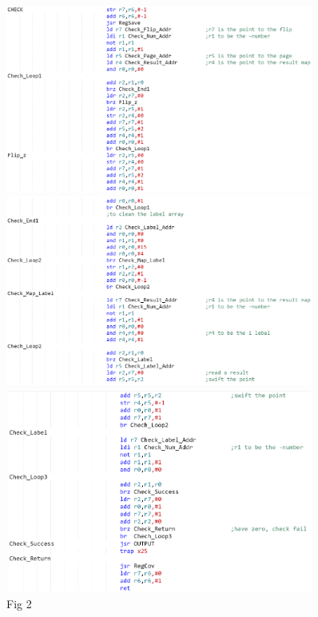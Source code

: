 \documentclass[twoside]{article}
\begin{document}
\begin{CJK*}{UTF8}{gbsn}
	\begin{figure}[htbp]
		\centering
		\caption{Fig 2} %
		\begin{minipage}[t]{0.4\textwidth}
			\small
			\centering
			\includegraphics[width=0.9\textwidth]{3.eps}
		\end{minipage}
		\begin{minipage}[t]{0.4\textwidth}
			\small
			\centering
			\includegraphics[width=0.9\textwidth]{4.eps}
		\end{minipage}
		\begin{minipage}[t]{0.4\textwidth}
			\small
			\centering
			\includegraphics[width=0.9\textwidth]{1.eps}
		\end{minipage}
		
	\end{figure}


\end{CJK*}
\end{document}
